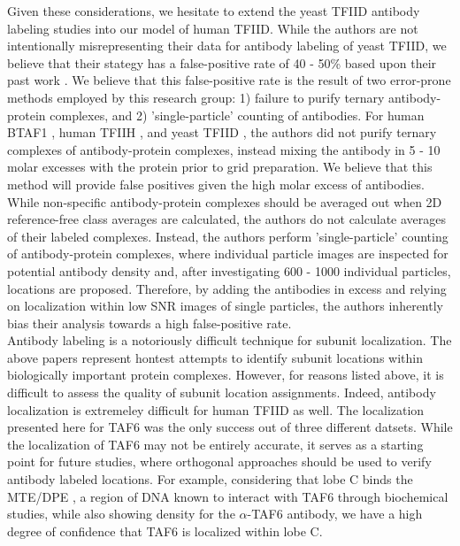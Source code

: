 \indent Given these considerations, we hesitate to extend the yeast TFIID antibody labeling studies into our model of human TFIID. While the authors are not intentionally misrepresenting their data for antibody labeling of yeast TFIID, we believe that their stategy has a false-positive rate of 40 - 50\% based upon their past work \cite{Pereira_2004,Schultz_2000}. We believe that this false-positive rate is the result of two error-prone methods employed by this research group: 1) failure to purify ternary antibody-protein complexes, and 2) 'single-particle' counting of antibodies. For human BTAF1 \cite{Pereira_2004}, human TFIIH \cite{Schultz_2000}, and yeast TFIID \cite{Leurent_1554,Leurent_1797}, the authors did not purify ternary complexes of antibody-protein complexes, instead mixing the antibody in 5 - 10 molar excesses with the protein prior to grid preparation. We believe that this method will provide false positives given the high molar excess of antibodies. While non-specific antibody-protein complexes should be averaged out when 2D reference-free class averages are calculated, the authors do not calculate averages of their labeled complexes. Instead, the authors perform 'single-particle' counting of antibody-protein complexes, where individual particle images are inspected for potential antibody density and, after investigating  600 - 1000 individual particles, locations are proposed.  Therefore, by adding the antibodies in excess and relying on localization within low SNR images of single particles, the authors inherently bias their analysis towards a high false-positive rate. \\
\indent Antibody labeling is a notoriously difficult technique for subunit localization. The above papers represent hontest attempts to identify subunit locations within biologically important protein complexes. However, for reasons listed above, it is difficult to assess the quality of subunit location assignments. Indeed, antibody localization is extremeley difficult for human TFIID as well. The localization presented here for TAF6 was the only success out of three different datsets. While the localization of TAF6 may not be entirely accurate, it serves as a starting point for future studies, where orthogonal approaches should be used to verify antibody labeled locations. For example, considering that lobe C binds the MTE/DPE , a region of DNA known to interact with TAF6 through biochemical studies, while also showing density for the $\alpha$-TAF6 antibody, we have a high degree of confidence that TAF6 is localized within lobe C. \\

